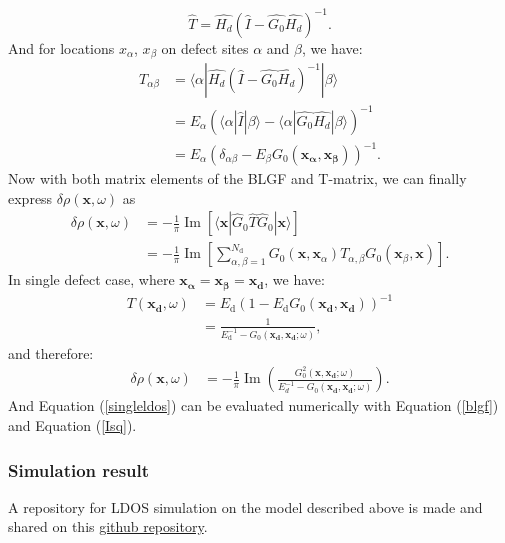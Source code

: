 \begin{equation}
	\hat{T} = \hat{H_d} (\hat{I} - \hat{G_0}\hat{H_d})^{-1}.
\end{equation} 
And for locations $x_\alpha$, $x_\beta$ on defect sites $\alpha$ and $\beta$, we have: 
\begin{align}
	T_{\alpha\beta} &= \langle \alpha|\hat{H_d} (\hat{I} - \hat{G_0}\hat{H_d})^{-1} | \beta\rangle \\
	&= E_\alpha(\langle \alpha|\hat{I}|\beta\rangle - \langle \alpha|\hat{G_0}\hat{H_d}|\beta \rangle)^{-1} \\
	&= E_\alpha(\delta_{\alpha \beta} - E_\beta G_0(\mathbf{x_\alpha},\mathbf{x_\beta}))^{-1} \label{T_matrix_ele}.
\end{align}
Now with both matrix elements of the \ac{BLGF} and T-matrix, we can finally express $\delta\rho(\mathbf{x},\omega)$ as 
\begin{align}
	\delta\rho(\mathbf{x},\omega) &= - \frac{1}{\pi} \operatorname{Im} \left[ \langle \mathbf{x} | \hat{G}_0 \hat{T} \hat{G}_0 | \mathbf{x} \rangle \right] \\
	&= -\frac{1}{\pi} \operatorname{Im} \left[\sum_{\alpha, \beta=1}^{N_{\text{d}}} G_0(\mathbf{x}, \mathbf{x}_\alpha) T_{\alpha, \beta} G_0(\mathbf{x}_\beta, \mathbf{x})\right]. \label{multi_defect_eq}
\end{align}
In single defect case, where $\mathbf{x_\alpha} = \mathbf{x_\beta} = \mathbf{x_d}$, we have: 
\begin{align}
	T(\mathbf{x_d},\omega) &= E_{\text{d}} \left( 1 - E_{\text{d}} G_0(\mathbf{x_d}, \mathbf{x_d}) \right)^{-1} \label{T_matrix_ele} \\
	&= \frac{1}{E_{\text{d}}^{-1} - G_0(\mathbf{x_d}, \mathbf{x_d}; \omega)},
\end{align}
and therefore: 
\begin{align}
	\delta\rho(\mathbf{x},\omega) &= - \frac{1}{\pi} \operatorname{Im}(\frac{G_0^2(\mathbf{x},\mathbf{x_d};\omega)}{E_d^{-1} - G_0(\mathbf{x_d},\mathbf{x_d};\omega)}) \label{singleldos}. 
\end{align}
And Equation (\ref{singleldos}) can be evaluated numerically with Equation (\ref{blgf}) and Equation (\ref{Isq}).

\subsubsection{Simulation result}
A repository for \ac{LDOS} simulation on the model described above is made and shared on this \href{https://github.com/Plswearpants/QPI\_simulation}{github repository}.

